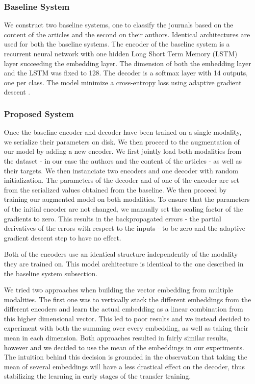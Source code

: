 \documentclass[12pt]{article}
\begin{document}

\subsubsection{Baseline System}
We construct two baseline systems, one to classify the journals based on the
content of the articles and the second on their authors. Identical architectures are used for both the baseline
systems. The encoder of the baseline system is a recurrent neural network with one hidden Long Short Term Memory (LSTM) layer succeeding the embedding layer. The dimension of both the embedding layer and the LSTM was fixed to 128. The decoder is a softmax layer with 14 outputs, one per class. The model minimize a cross-entropy loss using adaptive gradient descent \cite{duchi2011adaptive}. 

\subsubsection{Proposed System}
Once the baseline encoder and decoder have been trained on a single modality, we serialize their parameters on disk. We then proceed to the augmentation of our model by adding a new encoder. We first jointly load both modalities from the dataset - in our case the authors and the content of the articles - as well as their targets. We then instanciate two encoders and one decoder with random initialization. The parameters of the decoder and of one of the encoder are set from the serialized values obtained from the baseline. We then proceed by training our augmented model on both modalities. To ensure that the parameters of the initial encoder are not changed, we manually set the scaling factor of the gradients to zero. This results in the backpropagated errors - the partial derivatives of the errors with respect to the inputs - to be zero and the adaptive gradient descent step to have no effect.

Both of the encoders use an identical structure independently of the modality they are trained on. This model architecture is identical to the one described in the baseline system subsection.

We tried two approaches when building the vector embedding from multiple modalities. The first one was to vertically stack the different embeddings from the different encoders and learn the actual embedding as a linear combination from this higher dimensional vector. This led to poor results and we instead decided to experiment with both the summing over every embedding, as well as taking their mean in each dimension. Both approaches resulted in fairly similar results, however and we decided to use the mean of the embeddings in our experiments. The intuition behind this decision is grounded in the observation that taking the mean of several embeddings will have a less drastical effect on the decoder, thus stabilizing the learning in early stages of the transfer training.
\end{document}
